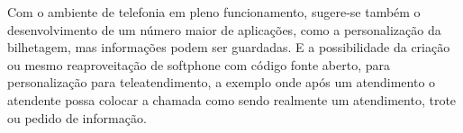Com o ambiente de telefonia em pleno funcionamento, sugere-se também o desenvolvimento de um número maior de aplicações, como a personalização da bilhetagem, mas informações podem ser guardadas. E a possibilidade da criação ou mesmo reaproveitação de softphone com código fonte aberto, para personalização para teleatendimento, a exemplo onde após um atendimento o atendente possa colocar a chamada como sendo realmente um atendimento, trote ou pedido de informação.

